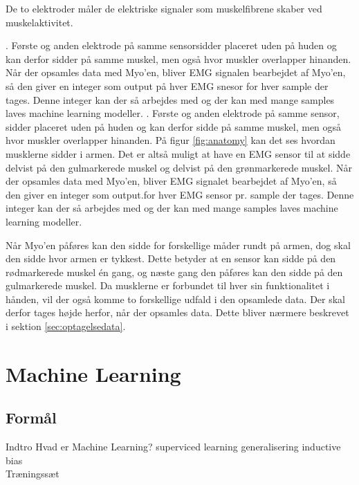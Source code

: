 De to elektroder måler de elektriske signaler som muskelfibrene skaber ved muskelaktivitet.

\cite{nerveledning}. Første og anden elektrode på samme sensorsidder placeret uden på huden og kan derfor sidder på samme muskel, men også hvor muskler overlapper hinanden. Når der opsamles data med Myo'en, bliver EMG signalen bearbejdet af Myo'en, så den giver en integer som output på hver EMG snesor for hver sample der tages. Denne integer kan der så arbejdes med og der kan med mange samples laves machine learning modeller.
\citep{RefWorks:13}. Første og anden elektrode på samme sensor, sidder placeret uden på huden og kan derfor sidde på samme muskel, men også hvor muskler overlapper hinanden. På figur \ref{fig:anatomy} kan det ses hvordan musklerne sidder i armen. Det er altså muligt at have en EMG sensor til at sidde delvist på den gulmarkerede muskel og delvist på den grønmarkerede muskel. Når der opsamles data med Myo'en, bliver EMG signalet bearbejdet af Myo'en, så den giver en integer som output.for hver EMG sensor pr. sample der tages. Denne integer kan der så arbejdes med og der kan med mange samples laves machine learning modeller.


Når Myo'en påføres kan den sidde for forskellige måder rundt på armen, dog skal den sidde hvor armen er tykkest. Dette betyder at en sensor kan sidde på den rødmarkerede muskel én gang, og næste gang den påføres kan den sidde på den gulmarkerede muskel. Da musklerne er forbundet til hver sin funktionalitet i hånden, vil der også komme to forskellige udfald i den opsamlede data. Der skal derfor tages højde herfor, når der opsamles data. Dette bliver nærmere beskrevet i sektion \ref{sec:optagelsedata}.

\section{Machine Learning}
\label{sec:machineLearning}

\subsection{Formål}

Indtro
Hvad er Machine Learning?
superviced learning
generalisering
inductive bias
\\

Træningssæt 

